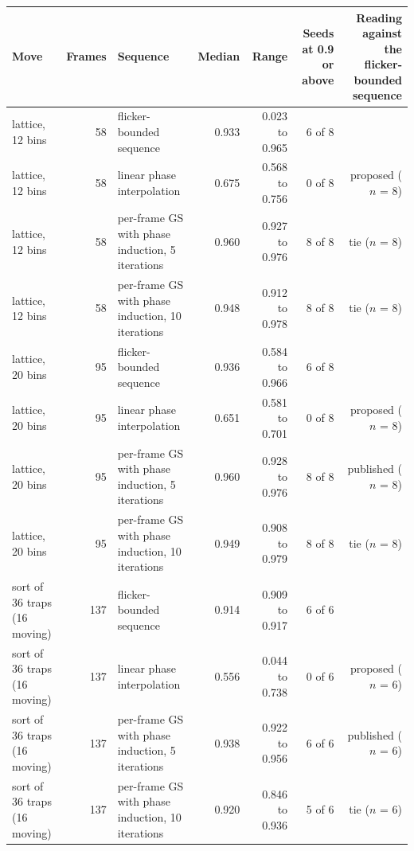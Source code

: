 \begin{tabular}{@{}l r l r r r r@{}}
\toprule
Move & Frames & Sequence & Median & Range & Seeds at 0.9 or above & Reading against the flicker-bounded sequence \\
\midrule
lattice, 12 bins & 58 & flicker-bounded sequence & 0.933 & 0.023 to 0.965 & 6 of 8 &  \\
lattice, 12 bins & 58 & linear phase interpolation & 0.675 & 0.568 to 0.756 & 0 of 8 & proposed ($n$ = 8) \\
lattice, 12 bins & 58 & per-frame GS with phase induction, 5 iterations & 0.960 & 0.927 to 0.976 & 8 of 8 & tie ($n$ = 8) \\
lattice, 12 bins & 58 & per-frame GS with phase induction, 10 iterations & 0.948 & 0.912 to 0.978 & 8 of 8 & tie ($n$ = 8) \\
lattice, 20 bins & 95 & flicker-bounded sequence & 0.936 & 0.584 to 0.966 & 6 of 8 &  \\
lattice, 20 bins & 95 & linear phase interpolation & 0.651 & 0.581 to 0.701 & 0 of 8 & proposed ($n$ = 8) \\
lattice, 20 bins & 95 & per-frame GS with phase induction, 5 iterations & 0.960 & 0.928 to 0.976 & 8 of 8 & published ($n$ = 8) \\
lattice, 20 bins & 95 & per-frame GS with phase induction, 10 iterations & 0.949 & 0.908 to 0.979 & 8 of 8 & tie ($n$ = 8) \\
sort of 36 traps (16 moving) & 137 & flicker-bounded sequence & 0.914 & 0.909 to 0.917 & 6 of 6 &  \\
sort of 36 traps (16 moving) & 137 & linear phase interpolation & 0.556 & 0.044 to 0.738 & 0 of 6 & proposed ($n$ = 6) \\
sort of 36 traps (16 moving) & 137 & per-frame GS with phase induction, 5 iterations & 0.938 & 0.922 to 0.956 & 6 of 6 & published ($n$ = 6) \\
sort of 36 traps (16 moving) & 137 & per-frame GS with phase induction, 10 iterations & 0.920 & 0.846 to 0.936 & 5 of 6 & tie ($n$ = 6) \\
\bottomrule
\end{tabular}
